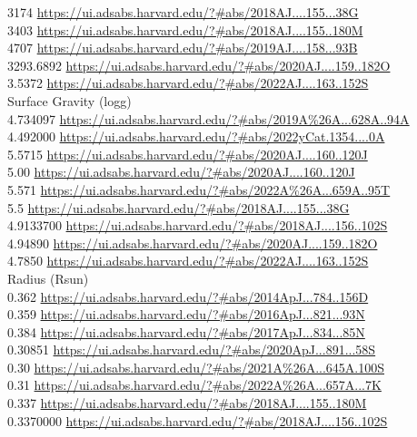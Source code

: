3174 \url{https://ui.adsabs.harvard.edu/?#abs/2018AJ....155...38G}\\
3403 \url{https://ui.adsabs.harvard.edu/?#abs/2018AJ....155..180M}\\
4707 \url{https://ui.adsabs.harvard.edu/?#abs/2019AJ....158...93B}\\
3293.6892 \url{https://ui.adsabs.harvard.edu/?#abs/2020AJ....159..182O}\\
3.5372 \url{https://ui.adsabs.harvard.edu/?#abs/2022AJ....163..152S}\\
Surface Gravity (logg)\\
4.734097 \url{https://ui.adsabs.harvard.edu/?#abs/2019A%26A...628A..94A}\\
4.492000 \url{https://ui.adsabs.harvard.edu/?#abs/2022yCat.1354....0A}\\
5.5715 \url{https://ui.adsabs.harvard.edu/?#abs/2020AJ....160..120J}\\
5.00 \url{https://ui.adsabs.harvard.edu/?#abs/2020AJ....160..120J}\\
5.571 \url{https://ui.adsabs.harvard.edu/?#abs/2022A%26A...659A..95T}\\
5.5 \url{https://ui.adsabs.harvard.edu/?#abs/2018AJ....155...38G}\\
4.9133700 \url{https://ui.adsabs.harvard.edu/?#abs/2018AJ....156..102S}\\
4.94890 \url{https://ui.adsabs.harvard.edu/?#abs/2020AJ....159..182O}\\
4.7850 \url{https://ui.adsabs.harvard.edu/?#abs/2022AJ....163..152S}\\
Radius (Rsun)\\
0.362 \url{https://ui.adsabs.harvard.edu/?#abs/2014ApJ...784..156D}\\
0.359 \url{https://ui.adsabs.harvard.edu/?#abs/2016ApJ...821...93N}\\
0.384 \url{https://ui.adsabs.harvard.edu/?#abs/2017ApJ...834...85N}\\
0.30851 \url{https://ui.adsabs.harvard.edu/?#abs/2020ApJ...891...58S}\\
0.30 \url{https://ui.adsabs.harvard.edu/?#abs/2021A%26A...645A.100S}\\
0.31  \url{https://ui.adsabs.harvard.edu/?#abs/2022A%26A...657A...7K}\\
0.337 \url{https://ui.adsabs.harvard.edu/?#abs/2018AJ....155..180M}\\
0.3370000 \url{https://ui.adsabs.harvard.edu/?#abs/2018AJ....156..102S}\\

